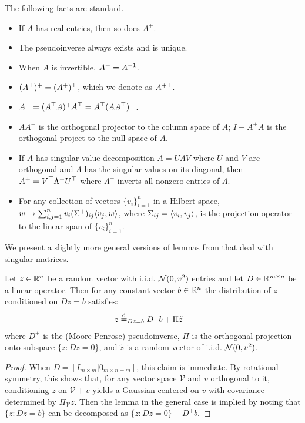 \documentclass[main.tex]{subfiles}
\begin{document}
The following facts are standard.
\begin{itemize}
    \item If $A$ has real entries, then so does $A^+$.
    \item The pseudoinverse always exists and is unique.
    \item When $A$ is invertible, $A^+ = {A}^{-1}$.
    \item $(A^\top)^+ = (A^+)^\top$, which we denote as $A^{+\top}$.
    \item $A^+ = (A^\top A)^+ A^\top = A^\top (A A^\top)^+$.
    \item $AA^+$ is the orthogonal projector to the column space of $A$;
        $I - A^+ A$ is the orthogonal project to the null space of $A$.
    \item If $A$ has singular value decomposition $A = U\Lambda V$ where $U$ and $V$ are orthogonal and $\Lambda$ has the singular values on its diagonal, then $A^+ = V^\top \Lambda^+ U^\top$ where $\Lambda^+$ inverts all nonzero entries of $\Lambda$.
    \item For any collection of vectors $\{v_i\}_{i=1}^n$ in a Hilbert space, $w \mapsto \sum_{i,j=1}^n v_i (\Sigma^+)_{ij} \langle v_j, w \rangle $, where $\Sigma_{ij} = \langle v_i, v_j \rangle$, is the projection operator to the linear span of $\{v_i\}_{i=1}^n$.
\end{itemize}

We present a slightly more general versions of lemmas from \citet{bayati_dynamics_2011} that deal with singular matrices.
\begin{lemma}\label{lemma:condTrickVec}
Let $z \in \mathbb{R}^n$ be a random vector with i.i.d. $\mathcal{N}(0, v^2)$ entries and let $D \in \mathbb{R}^{m\times n}$ be a linear operator.
Then for any constant vector $b \in \mathbb{R}^n$ the distribution of $z$ conditioned on $Dz = b$ satisfies:
\begin{align*}
    z
        &\overset{\mathrm{d}}{=}_{Dz = b}
            D^+ b + \Pi \tilde z
\end{align*}
where $D^+$ is the (Moore-Penrose) pseudoinverse, $\Pi$ is the orthogonal projection onto subspace $\{z: Dz = 0\}$, and $\tilde z$ is a random vector of i.i.d. $\mathcal{N}(0, v^2)$.
\end{lemma}
\begin{proof}
When $D = [I_{m \times m} | 0_{m \times {n-m}}]$, this claim is immediate.
By rotational symmetry, this shows that, for any vector space $\mathcal V$ and $v$ orthogonal to it, conditioning $z$ on $\mathcal V + v$ yields a Gaussian centered on $v$ with covariance determined by $\Pi_{\mathcal V} z$.
Then the lemma in the general case is implied by noting that $\{z: Dz = b\}$ can be decomposed as $\{z: Dz = 0 \} + D^+ b$.
\end{proof}
\end{document}
